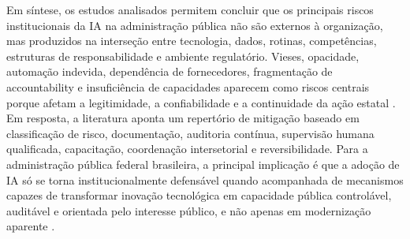 \documentclass[12pt,a4paper]{article}
\begin{document}
Em síntese, os estudos analisados permitem concluir que os principais riscos institucionais da IA na administração pública não são externos à organização, mas produzidos na interseção entre tecnologia, dados, rotinas, competências, estruturas de responsabilidade e ambiente regulatório. Vieses, opacidade, automação indevida, dependência de fornecedores, fragmentação de accountability e insuficiência de capacidades aparecem como riscos centrais porque afetam a legitimidade, a confiabilidade e a continuidade da ação estatal \autocite{criado2024artificial} \autocite{parycek2023artificial} \autocite{mkander2023auditing}. Em resposta, a literatura aponta um repertório de mitigação baseado em classificação de risco, documentação, auditoria contínua, supervisão humana qualificada, capacitação, coordenação intersetorial e reversibilidade. Para a administração pública federal brasileira, a principal implicação é que a adoção de IA só se torna institucionalmente defensável quando acompanhada de mecanismos capazes de transformar inovação tecnológica em capacidade pública controlável, auditável e orientada pelo interesse público, e não apenas em modernização aparente \autocite{minkkinen2022continuous} \autocite{melo2026competencias} \autocite{criado2024inteligencia}.
\end{document}
